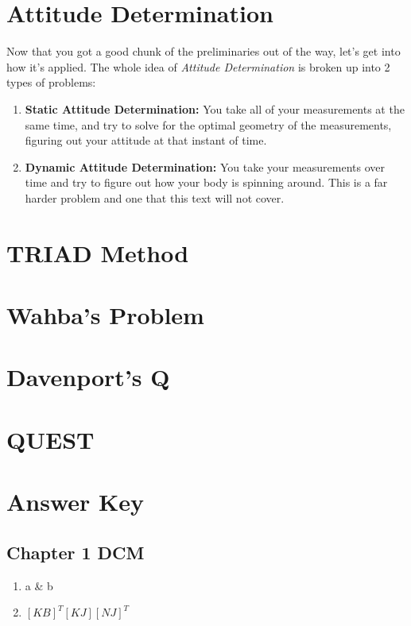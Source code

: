 \documentclass[a4paper,14pt]{extreport}
\begin{document}
\chapter{Attitude Determination}
Now that you got a good chunk of the preliminaries out of the way, let's get into how it's applied. The whole idea of \emph{Attitude Determination} is broken up into 2 types of problems:
\begin{enumerate}
\item{
\textbf{Static Attitude Determination:} You take all of your measurements at the same time, and try to solve for the optimal geometry of the measurements, figuring out your attitude at that instant of time.
}
\item{\textbf{Dynamic Attitude Determination:} You take your measurements over time and try to figure out how your body is spinning around. This is a far harder problem and one that this text will not cover.
}
\end{enumerate}
	

\chapter{TRIAD Method}

\chapter{Wahba's Problem}

\chapter{Davenport's Q}

\chapter{QUEST}

\chapter{Answer Key}
\section{Chapter 1 DCM}
\begin{enumerate}
\item{a \& b}
\item{$[KB]^T[KJ][NJ]^T$}
\end{enumerate}
\end{document}

